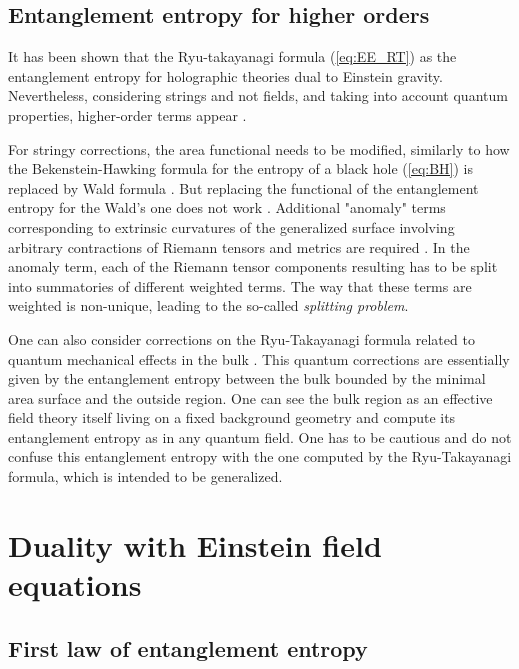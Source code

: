 \documentclass[twocolumn]{revtex4}
\begin{document}
\subsection{Entanglement entropy for higher orders} \label{s:EE_HO}

It has been shown that the Ryu-takayanagi formula (\ref{eq:EE_RT}) as the entanglement entropy for holographic theories dual to Einstein gravity. Nevertheless, considering strings and not fields, and taking into account quantum properties, higher-order terms appear \cite{bueno_holographic_2021}.

For stringy corrections, the area functional needs to be modified, similarly to how the Bekenstein-Hawking formula for the entropy of a black hole (\ref{eq:BH}) is replaced by Wald formula \cite{iyer_properties_1994}. But replacing the functional of the entanglement entropy for the Wald's one does not work \cite{bueno_holographic_2021}. Additional "anomaly" terms corresponding to extrinsic curvatures of the generalized surface involving arbitrary contractions of Riemann tensors and metrics are required \cite{dong_holographic_2014}. In the anomaly term, each of the Riemann tensor components resulting has to be split into summatories of different weighted terms. The way that these terms are weighted is non-unique, leading to the so-called \textit{splitting problem}.

One can also consider corrections on the Ryu-Takayanagi formula related to quantum mechanical effects in the bulk \cite{faulkner_quantum_2013}. This quantum corrections are essentially given by the entanglement entropy between the bulk bounded by the minimal area surface and the outside region. One can see the bulk region as an effective field theory itself living on a fixed background geometry and compute its entanglement entropy as in any quantum field. One has to be cautious and do not confuse this entanglement entropy with the one computed by the Ryu-Takayanagi formula, which is intended to be generalized.


\section{Duality with Einstein field equations} \label{s:EQ}


\subsection{First law of entanglement entropy} \label{ss:FLEE}
\end{document}
